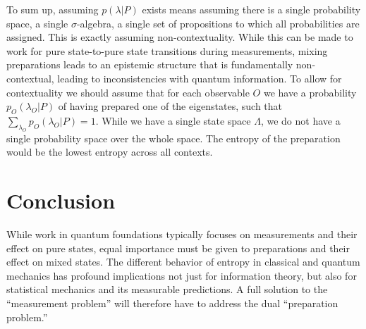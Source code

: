\documentclass[twocolumn,prl,floatfix,superscriptaddress]{revtex4-2}
\begin{document}
To sum up, assuming $p(\lambda|P)$ exists means assuming there is a single probability space, a single $\sigma$-algebra, a single set of propositions to which all probabilities are assigned. This is exactly assuming non-contextuality. While this can be made to work for pure state-to-pure state transitions during measurements, mixing preparations leads to an epistemic structure that is fundamentally non-contextual, leading to inconsistencies with quantum information. To allow for contextuality we should assume that for each observable $O$ we have a probability $p_O(\lambda_O|P)$ of having prepared one of the eigenstates, such that $\sum_{\lambda_O} p_O(\lambda_O|P) = 1$. While we have a single state space $\Lambda$, we do not have a single probability space over the whole space. The entropy of the preparation would be the lowest entropy across all contexts.


\section{Conclusion}

While work in quantum foundations typically focuses on measurements and their effect on pure states, equal importance must be given to preparations and their effect on mixed states. The different behavior of entropy in classical and quantum mechanics has profound implications not just for information theory, but also for statistical mechanics and its measurable predictions. A full solution to the ``measurement problem'' will therefore have to address the dual ``preparation problem.''


%

\end{document}
